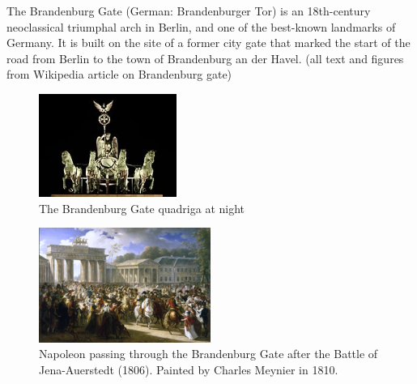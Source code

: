 \documentclass{article}
\begin{document}
The Brandenburg Gate (German: Brandenburger Tor) is an 18th-century neoclassical triumphal arch in Berlin, and one of the best-known landmarks of Germany. It is built on the site of a former city gate that marked the start of the road from Berlin to the town of Brandenburg an der Havel.
(all text and figures from Wikipedia article on Brandenburg gate)

\begin{figure}
\includegraphics[width=0.4\textwidth]{220px-Brandenburg_Gate_Quadriga_at_Night_from_wikipedia}

\caption{The Brandenburg Gate quadriga at night}
\end{figure}

\begin{figure} 
\includegraphics[width=0.5\textwidth]{270px-Charles_Meynier_-_Napoleon_in_Berlin}

\caption{Napoleon passing through the Brandenburg Gate after the Battle of Jena-Auerstedt (1806). Painted by Charles Meynier in 1810.}
\end{figure}
\end{document}
